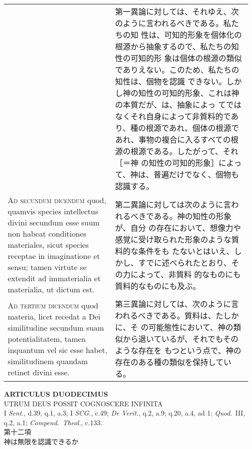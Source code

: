 \documentclass[10pt]{jsarticle} %
\begin{document}
\begin{longtable}{p{21em}p{21em}}
&

第一異論に対しては、それゆえ、次のように言われるべきである。私たちの知
性は、可知的形象を個体化の根源から抽象するので、私たちの知性の可知的形
象は個体の根源の類似でありえない。このため、私たちの知性は、個物を認識
できない。しかし神の知性の可知的形象、これは神の本質だが、は、抽象によっ
てではなくそれ自身によって非質料的であり、種の根源であれ、個体の根源で
あれ、事物の複合に入るすべての根源の根源である。したがって、それ［＝神
の知性の可知的形象］によって、神は、普遍だけでなく、個物も認識する。


\\


{\scshape Ad secundum dicendum} quod, quamvis species intellectus
divini secundum esse suum non habeat conditiones materiales, sicut
species receptae in imaginatione et sensu; tamen virtute se extendit
ad immaterialia et materialia, ut dictum est.


&

第二異論に対しては次のように言われるべきである。神の知性の形象が、自分
の存在において、想像力や感覚に受け取られた形象のような質料的な条件をも
たないとはいえ、しかし、すでに述べられたとおり、その力によって、非質料
的なものにも質料的なものにも及ぶ。


\\


{\scshape Ad tertium dicendum} quod materia, licet recedat a Dei
similitudine secundum suam potentialitatem, tamen inquantum vel sic
esse habet, similitudinem quandam retinet divini esse.


&

第三異論に対しては、次のように言われるべきである。質料は、たしかに、そ
の可能態性において、神の類似から退いているが、それでもそのような存在を
もつという点で、神の存在のある種の類似を保持している。




\end{longtable}
\newpage


\begin{center}
{\Large {\bf ARTICULUS DUODECIMUS}}\\ {\large UTRUM DEUS POSSIT
COGNOSCERE INFINITA}\\ {\footnotesize I {\itshape Sent.}, d.39, q.1,
a.3; I {\itshape SCG.}, c.49; {\itshape De Verit.}, q.2, a.9;
q.20, a.4, ad 1; {\itshape Quod}.~III, q.2, a.1; {\itshape
Compend.~Theol.}, c.133.}\\ {\Large 第十二項\\神は無限を認識できるか}
\end{center}
\end{document}
